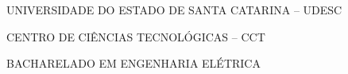 

\renewcommand{\imprimircapa}{%
	\begin{capa}%
		\center

		{\fontseries{b}\selectfont\MakeTextUppercase{UNIVERSIDADE DO ESTADO DE SANTA CATARINA -- UDESC}}
		
		{\fontseries{b}\selectfont\MakeTextUppercase{CENTRO DE CIÊNCIAS TECNOLÓGICAS -- CCT  }}
		
		{\fontseries{b}\selectfont\MakeTextUppercase{BACHARELADO EM ENGENHARIA ELÉTRICA}}
		
		\vfill
		
		{\fontseries{b}\selectfont\MakeTextUppercase{\normalsize\imprimirautor}}
		
		\vfill
		\begin{center}
			{\fontseries{b}\selectfont\MakeTextUppercase{\imprimirtitulo}}
		\end{center}
		\vfill
		
		\vfill
		
		{\fontseries{b}\selectfont\MakeTextUppercase{\imprimirlocal}}
		\par
		{\selectfont \imprimirdata}
		\vspace*{1cm}
	\end{capa}
}



\imprimircapa				%

